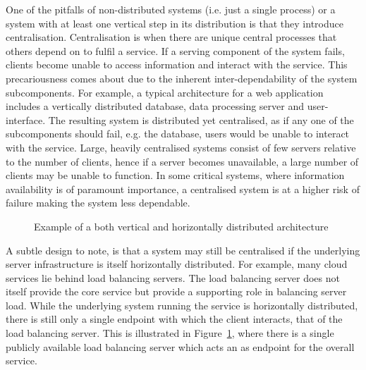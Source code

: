 One of the pitfalls of non-distributed systems (i.e. just a single process) or a system with at least one vertical step in its distribution is that they introduce centralisation. Centralisation is when there are unique central processes that others depend on to fulfil a service\cite{raval2016decentralised}. If a serving component of the system fails, clients become unable to access information and interact with the service. This precariousness comes about due to the inherent inter-dependability of the system subcomponents. For example, a typical architecture for a web application includes a vertically distributed database, data processing server and user-interface. The resulting system is distributed yet centralised, as if any one of the subcomponents should fail, e.g. the database, users would be unable to interact with the service. Large, heavily centralised systems consist of few servers relative to the number of clients, hence if a server becomes unavailable, a large number of clients may be unable to function. In some critical systems, where information availability is of paramount importance, a centralised system is at a higher risk of failure making the system less dependable.

\begin{figure}[ht]
    \centering
    
    \caption{Example of a both vertical and horizontally distributed architecture}
    \label{fig:vertHorArch}
\end{figure}

A subtle design to note, is that a system may still be centralised if the underlying server infrastructure is itself horizontally distributed. For example, many cloud services lie behind load balancing servers. The load balancing server does not itself provide the core service but provide a supporting role in balancing server load\cite{rajagopalan2020load}. While the underlying system running the service is horizontally distributed, there is still only a single endpoint with which the client interacts, that of the load balancing server. This is illustrated in Figure~\ref{fig:vertHorArch}, where there is a single publicly available load balancing server which acts an as endpoint for the overall service.

